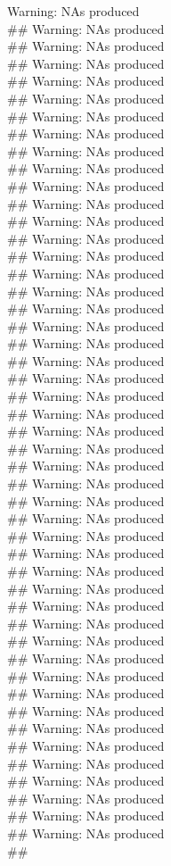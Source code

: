 \documentclass{article}\usepackage[]{graphicx}\usepackage[]{color}
\makeatletter
\newenvironment{kframe}{%
 \def\at@end@of@kframe{}%
 \ifinner\ifhmode%
  \def\at@end@of@kframe{\end{minipage}}%
  \begin{minipage}{\columnwidth}%
 \fi\fi%
 \def\FrameCommand##1{\hskip\@totalleftmargin \hskip-\fboxsep
 \colorbox{shadecolor}{##1}\hskip-\fboxsep
     \hskip-\linewidth \hskip-\@totalleftmargin \hskip\columnwidth}%
 \MakeFramed {\advance\hsize-\width
   \@totalleftmargin\z@ \linewidth\hsize
   \@setminipage}}%
 {\par\unskip\endMakeFramed%
 \at@end@of@kframe}
\newenvironment{knitrout}{}{} %
\makeatother
\begin{document}
\begin{knitrout}
\begin{kframe}
Warning: NAs produced\\\#\# Warning: NAs produced\\\#\# Warning: NAs produced\\\#\# Warning: NAs produced\\\#\# Warning: NAs produced\\\#\# Warning: NAs produced\\\#\# Warning: NAs produced\\\#\# Warning: NAs produced\\\#\# Warning: NAs produced\\\#\# Warning: NAs produced\\\#\# Warning: NAs produced\\\#\# Warning: NAs produced\\\#\# Warning: NAs produced\\\#\# Warning: NAs produced\\\#\# Warning: NAs produced\\\#\# Warning: NAs produced\\\#\# Warning: NAs produced\\\#\# Warning: NAs produced\\\#\# Warning: NAs produced\\\#\# Warning: NAs produced\\\#\# Warning: NAs produced\\\#\# Warning: NAs produced\\\#\# Warning: NAs produced\\\#\# Warning: NAs produced\\\#\# Warning: NAs produced\\\#\# Warning: NAs produced\\\#\# Warning: NAs produced\\\#\# Warning: NAs produced\\\#\# Warning: NAs produced\\\#\# Warning: NAs produced\\\#\# Warning: NAs produced\\\#\# Warning: NAs produced\\\#\# Warning: NAs produced\\\#\# Warning: NAs produced\\\#\# Warning: NAs produced\\\#\# Warning: NAs produced\\\#\# Warning: NAs produced\\\#\# Warning: NAs produced\\\#\# Warning: NAs produced\\\#\# Warning: NAs produced\\\#\# Warning: NAs produced\\\#\# Warning: NAs produced\\\#\# Warning: NAs produced\\\#\# Warning: NAs produced\\\#\# Warning: NAs produced\\\#\# Warning: NAs produced\\\#\# Warning: NAs produced\\\#\# Warning: NAs produced\\\#\# 
\end{kframe}
\end{knitrout}
\end{document}
